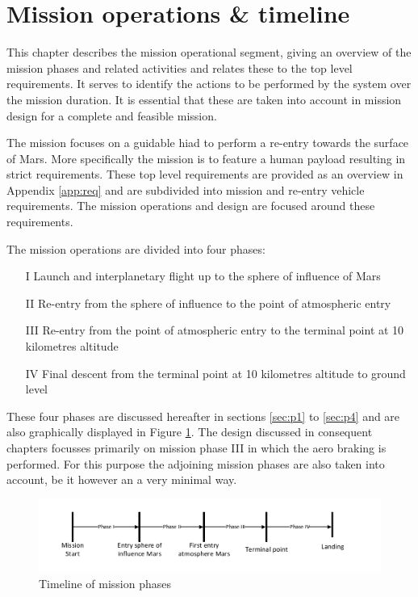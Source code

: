 \section{Mission operations \& timeline}\label{cha:opseg}
This chapter describes the mission operational segment, giving an overview of the mission phases and related activities and relates these to the top level requirements. It serves to identify the actions to be performed by the system over the mission duration. It is essential that these are taken into account in mission design for a complete and feasible mission. 

The mission focuses on a guidable \acrfull{hiad} to perform a re-entry towards the surface of Mars. More specifically the mission is to feature a human payload resulting in strict requirements. These top level requirements are provided as an overview in Appendix \ref{app:req} and are subdivided into mission and re-entry vehicle requirements. The mission operations and design are focused around these requirements.

The mission operations are divided into four phases: 

\begin{itemize}
\item[I]{Launch and interplanetary flight up to the sphere of influence of Mars}
\item[II]{Re-entry from the sphere of influence to the point of atmospheric entry}
\item[III]{Re-entry from the point of atmospheric entry to the terminal point at 10 kilometres altitude}
\item[IV]{Final descent from the terminal point at 10 kilometres altitude to ground level}
\end{itemize}

These four phases are discussed hereafter in sections \ref{sec:p1} to \ref{sec:p4} and are also graphically displayed in Figure  \ref{fig:time}. The design discussed in consequent chapters focusses primarily on mission phase III in which the aero braking is performed. For this purpose the adjoining mission phases are also taken into account, be it however an a very minimal way. 

\begin{figure}[H]
\centering
\includegraphics[width = 1.0\textwidth]{Figure/OPS.pdf}
\caption{Timeline of mission phases}
\label{fig:time}
\end{figure}



